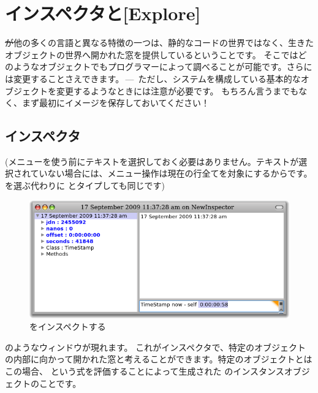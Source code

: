 \documentclass[a4paper,10pt,twoside]{book}
\begin{document}
\section{インスペクタと[Explore]}

\st が他の多くの言語と異なる特徴の一つは、静的なコードの世界ではなく、生きたオブジェクトの世界へ開かれた窓を提供しているということです。
そこではどのようなオブジェクトでもプログラマーによって調べることが可能です。さらには変更することさえできます。\,---\, ただし、システムを構成している基本的なオブジェクトを変更するようなときには注意が必要です。
もちろん言うまでもなく、まず最初にイメージを保存しておいてください！

\subsection{インスペクタ}

(メニューを使う前にテキストを選択しておく必要はありません。テキストが選択されていない場合には、メニュー操作は現在の行全てを対象にするからです。
 を選ぶ代わりに  とタイプしても同じです)

\begin{figure}[btp]
\begin{center}
\includegraphics[width=\textwidth]{inspectTimeNow1}
\end{center}
\caption{  をインスペクトする}
\end{figure}

 のようなウィンドウが現れます。
これがインスペクタで、特定のオブジェクトの内部に向かって開かれた窓と考えることができます。特定のオブジェクトとはこの場合、  という式を評価することによって生成された \mbox{} のインスタンスオブジェクトのことです。
\end{document}
